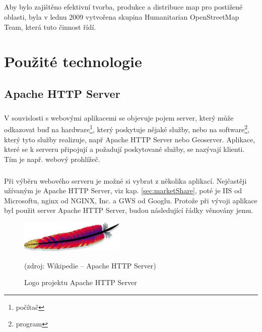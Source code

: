 \documentclass[11pt,a4paper,titlepage,oneside]{book}
\begin{document}
		\paragraph{} Aby bylo zajištěno efektivní tvorba, produkce a distribuce map pro postižené oblasti, byla v lednu 2009 vytvořena skupina Humanitarian OpenStreetMap Team\cite{wiki_hot}, která tuto činnost řídí.
	

\chapter{Použité technologie}

	\section{Apache HTTP Server}

		\paragraph{}\label{sec:server} V souvislosti s webovými aplikacemi se objevuje pojem server, který může odkazovat buď na hardware\footnote{počítač}, který poskytuje nějaké služby, nebo na software\footnote{program}, který tyto služby realizuje, např Apache HTTP Server nebo Geoserver. Aplikace, které se k serveru připojují a požadují poskytované služby, se nazývají klienti\label{sec:klient}. Tím je např. webový prohlížeč.
		\paragraph{} Při výběru webového serveru je možné si vybrat z několika aplikací. Nejčastěji užívaným je Apache HTTP Server, viz kap. \ref{sec:marketShare}, poté je IIS od Microsoftu, nginx od NGINX, Inc. a GWS od Googlu. Protože při vývoji aplikace byl použit server Apache HTTP Server, budou následující řádky věnovány jemu.
		\begin{figure}[!h]
			\begin{center}
				\includegraphics[width=5cm]{obrazky/apacheLogo.png}
				\caption{Logo projektu Apache HTTP Server}
				(zdroj: Wikipedie -- Apache HTTP Server\cite{wiki-Apache})
			\end{center}
		\end{figure}
\end{document}
